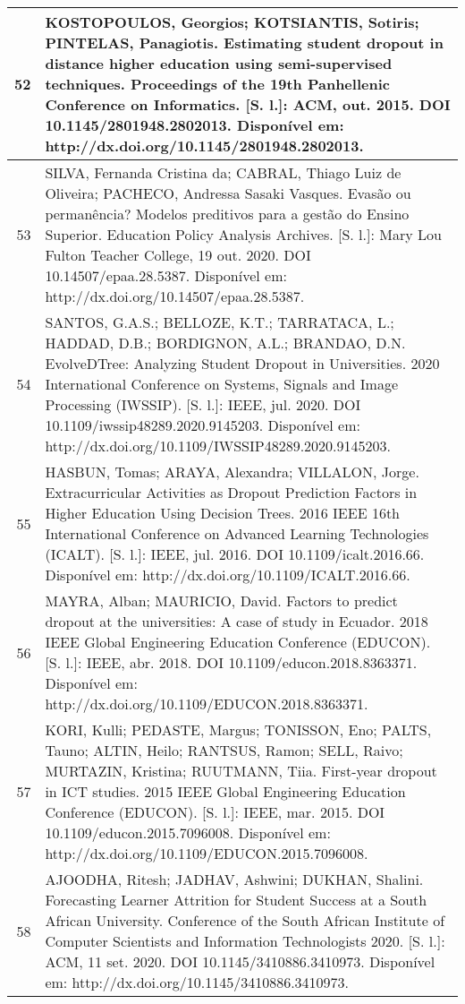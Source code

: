 \begin{apendicesenv}
\begin{longtable}[c]{|r|l|}
52 &
  \multicolumn{1}{p{14.5cm}|}{KOSTOPOULOS, Georgios; KOTSIANTIS, Sotiris; PINTELAS, Panagiotis. Estimating student dropout in distance higher education using semi-supervised techniques. Proceedings of the 19th Panhellenic Conference on Informatics. {[}S. l.{]}: ACM, out. 2015. DOI 10.1145/2801948.2802013. Disponível em: http://dx.doi.org/10.1145/2801948.2802013.} \\ \hline
53 &
  \multicolumn{1}{p{14.5cm}|}{SILVA, Fernanda Cristina da; CABRAL, Thiago Luiz de Oliveira; PACHECO, Andressa Sasaki Vasques. Evasão ou permanência? Modelos preditivos para a gestão do Ensino Superior. Education Policy Analysis Archives. {[}S. l.{]}: Mary Lou Fulton Teacher College, 19 out. 2020. DOI 10.14507/epaa.28.5387. Disponível em: http://dx.doi.org/10.14507/epaa.28.5387.} \\ \hline
54 &
  \multicolumn{1}{p{14.5cm}|}{SANTOS, G.A.S.; BELLOZE, K.T.; TARRATACA, L.; HADDAD, D.B.; BORDIGNON, A.L.; BRANDAO, D.N. EvolveDTree: Analyzing Student Dropout in Universities. 2020 International Conference on Systems, Signals and Image Processing (IWSSIP). {[}S. l.{]}: IEEE, jul. 2020. DOI 10.1109/iwssip48289.2020.9145203. Disponível em: http://dx.doi.org/10.1109/IWSSIP48289.2020.9145203.} \\ \hline
55 &
  \multicolumn{1}{p{14.5cm}|}{HASBUN, Tomas; ARAYA, Alexandra; VILLALON, Jorge. Extracurricular Activities as Dropout Prediction Factors in Higher Education Using Decision Trees. 2016 IEEE 16th International Conference on Advanced Learning Technologies (ICALT). {[}S. l.{]}: IEEE, jul. 2016. DOI 10.1109/icalt.2016.66. Disponível em: http://dx.doi.org/10.1109/ICALT.2016.66.} \\ \hline
56 &
  \multicolumn{1}{p{14.5cm}|}{MAYRA, Alban; MAURICIO, David. Factors to predict dropout at the universities: A case of study in Ecuador. 2018 IEEE Global Engineering Education Conference (EDUCON). {[}S. l.{]}: IEEE, abr. 2018. DOI 10.1109/educon.2018.8363371. Disponível em: http://dx.doi.org/10.1109/EDUCON.2018.8363371.} \\ \hline
57 &
  \multicolumn{1}{p{14.5cm}|}{KORI, Kulli; PEDASTE, Margus; TONISSON, Eno; PALTS, Tauno; ALTIN, Heilo; RANTSUS, Ramon; SELL, Raivo; MURTAZIN, Kristina; RUUTMANN, Tiia. First-year dropout in ICT studies. 2015 IEEE Global Engineering Education Conference (EDUCON). {[}S. l.{]}: IEEE, mar. 2015. DOI 10.1109/educon.2015.7096008. Disponível em: http://dx.doi.org/10.1109/EDUCON.2015.7096008.} \\ \hline
58 &
  \multicolumn{1}{p{14.5cm}|}{AJOODHA, Ritesh; JADHAV, Ashwini; DUKHAN, Shalini. Forecasting Learner Attrition for Student Success at a South African University. Conference of the South African Institute of Computer Scientists and Information Technologists 2020. {[}S. l.{]}: ACM, 11 set. 2020. DOI 10.1145/3410886.3410973. Disponível em: http://dx.doi.org/10.1145/3410886.3410973.} \\ \hline

\end{longtable}
\end{apendicesenv}
